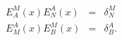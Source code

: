 \begin{equation}
\label{INVE}
\begin{array}{ccc}
  E^M_A(x) E^A_N(x) &=& \delta^M_N \\
  E^A_M(x) E^M_B(x) &=& \delta^A_B.
\end{array}
\end{equation}

